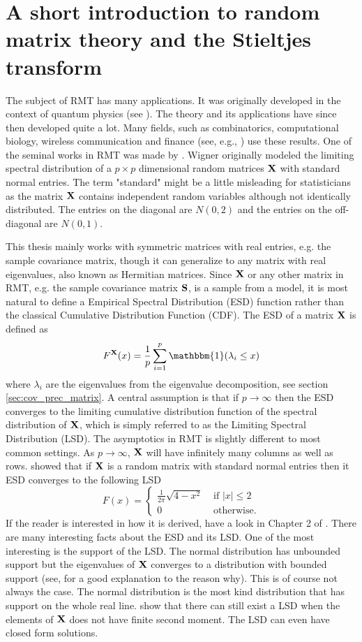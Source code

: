\documentclass[12pt, oneside]{book}\usepackage{knitr}
\begin{document}
{\section{A short introduction to random matrix theory and the Stieltjes transform}
The subject of RMT has many applications.
It was originally developed in the context of quantum physics (see \citet[Chapter 1 of]{mehta2004random}).
The theory and its applications have since then developed quite a lot.
Many fields, such as combinatorics, computational biology, wireless communication and finance (see, e.g., \citet{livan2018introduction}) use these results.
One of the seminal works in RMT was made by \citet{wigner1967random}. 
Wigner originally modeled the limiting spectral distribution of a $p \times p$ dimensional random matrices $\mathbf{X}$ with standard normal entries.
The term "standard" might be a little misleading for statisticians as the matrix $\mathbf{X}$ contains independent random variables although not identically distributed.
The entries on the diagonal are $N(0,2)$ and the entries on the off-diagonal are $N(0,1)$.

This thesis mainly works with symmetric matrices with real entries, e.g. the sample covariance matrix, though it can generalize to any matrix with real eigenvalues, also known as Hermitian matrices.
Since $\mathbf{X}$ or any other matrix in RMT, e.g. the sample covariance matrix $\mathbf{S}$, is a sample from a model, it is most natural to define a Empirical Spectral Distribution (ESD) function rather than the classical Cumulative Distribution Function (CDF).
The ESD of a matrix $\mathbf{X}$ is defined as
$$
F^{\bX}(x)= \frac{1}{p} \sum_{i=1}^p \mathbbm{1}(\lambda_i \leq x)
$$ 
where $\lambda_i$ are the eigenvalues from the eigenvalue decomposition, see section \ref{sec:cov_prec_matrix}.
A central assumption is that if $p \rightarrow \infty$ then the ESD converges to the limiting cumulative distribution function of the spectral distribution of $\mathbf{X}$, which is simply referred to as the Limiting Spectral Distribution (LSD).
The asymptotics in RMT is slightly different to most common settings.
As $p \rightarrow \infty$, $\mathbf{X}$ will have infinitely many columns as well as rows.
\citet{wigner1967random} showed that if $\mathbf{X}$ is a random matrix with standard normal entries then it ESD converges to the following LSD 
$$
F(x) = \begin{cases}
\frac{1}{2\pi} \sqrt{4-x^2} & \text{ if } |x|\leq 2 \\
0 & \text{ otherwise.}
\end{cases}
$$
If the reader is interested in how it is derived, have a look in Chapter 2 of \citet{bai2010spectral}.
There are many interesting facts about the ESD and its LSD. 
One of the most interesting is the support of the LSD.
The normal distribution has unbounded support but the eigenvalues of $\mathbf{X}$ converges to a distribution with bounded support (see, \citet{livan2018introduction} for a good explanation to the reason why).
This is of course not always the case.
The normal distribution is the most kind distribution that has support on the whole real line.
\citet{burda2002free} show that there can still exist a LSD when the elements of $\mathbf{X}$ does not have finite second moment.
The LSD can even have closed form solutions.

}
\end{document}
